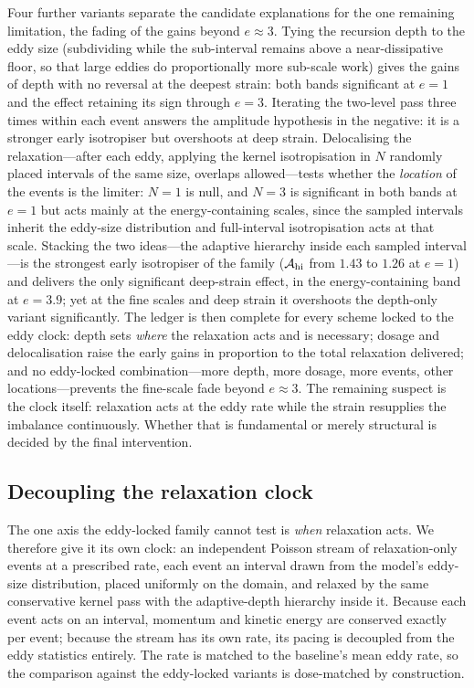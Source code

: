 \documentclass[lineno]{JFM-FLM_Au}
\begin{document}
Four further variants separate the candidate explanations for the one
remaining limitation, the fading of the gains beyond $e\approx3$. Tying
the recursion depth to the eddy size (subdividing while the sub-interval
remains above a near-dissipative floor, so that large eddies do
proportionally more sub-scale work) gives the gains of depth with no
reversal at the deepest strain: both bands significant at $e=1$ and the
effect retaining its sign through $e=3$. Iterating the two-level pass
three times within each event answers the amplitude hypothesis in the
negative: it is a stronger early isotropiser but overshoots at deep
strain. Delocalising the relaxation---after each eddy, applying the
kernel isotropisation in $N$ randomly placed intervals of the same size,
overlaps allowed---tests whether the \emph{location} of the events is
the limiter: $N=1$ is null, and $N=3$ is significant in both bands at
$e=1$ but acts mainly at the energy-containing scales, since the sampled
intervals inherit the eddy-size distribution and full-interval
isotropisation acts at that scale. Stacking the two ideas---the adaptive
hierarchy inside each sampled interval---is the strongest early
isotropiser of the family ($\mathcal A_{\rm hi}$ from $1.43$ to $1.26$
at $e=1$) and delivers the only significant deep-strain effect, in the
energy-containing band at $e=3.9$; yet at the fine scales and deep
strain it overshoots the depth-only variant significantly. The ledger
is then complete for every scheme locked to the eddy clock: depth sets
\emph{where} the relaxation acts and is necessary; dosage and
delocalisation raise the early gains in proportion to the total
relaxation delivered; and no eddy-locked combination---more depth, more
dosage, more events, other locations---prevents the fine-scale fade
beyond $e\approx3$. The remaining suspect is the clock itself:
relaxation acts at the eddy rate while the strain resupplies the
imbalance continuously. Whether that is fundamental or merely
structural is decided by the final intervention.

\subsection{Decoupling the relaxation clock}\label{sec:clock}

The one axis the eddy-locked family cannot test is \emph{when}
relaxation acts. We therefore give it its own clock: an independent
Poisson stream of relaxation-only events at a prescribed rate, each
event an interval drawn from the model's eddy-size distribution, placed
uniformly on the domain, and relaxed by the same conservative kernel
pass with the adaptive-depth hierarchy inside it. Because each event
acts on an interval, momentum and kinetic energy are conserved exactly
per event; because the stream has its own rate, its pacing is decoupled
from the eddy statistics entirely. The rate is matched to the
baseline's mean eddy rate, so the comparison against the eddy-locked
variants is dose-matched by construction.
\end{document}
